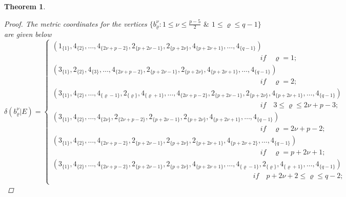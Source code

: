 \documentclass[]{interact}
\theoremstyle{plain}%
\newtheorem{theorem}{Theorem}[section]
\theoremstyle{definition}
\theoremstyle{remark}
\begin{document}
\begin{theorem}
\begin{proof}
                    \noindent The metric coordinates for the vertices 
                     $\{b^\nu_\varrho:1\leq \nu\leq \frac{p-5}{2} $ $ \& $  $1\leq \varrho\leq q-1 \}$ are given below
                        \begin{equation*}
                        \delta(b^{\nu}_{\varrho}|E)=
                   \begin{cases}
                   (1_{\{1\}},4_{\{2\}},\ldots,4_{\{2\nu+p-2\}},2_{\{p+2\nu-1\}},2_{\{p+2\nu\}},4_{\{p+2\nu+1\}},\ldots,4_{\{q-1\}})\\\qquad  \qquad \qquad \qquad \qquad \qquad \qquad \qquad \qquad \qquad  \qquad \qquad\qquad\qquad\quad\textit{if}\quad \varrho= 1;\\
         (3_{\{1\}}, 2_{\{ 2\}},4_{\{3\}},\ldots,4_{\{2\nu+p-2\}},2_{\{p+2\nu-1\}},2_{\{p+2\nu\}},4_{\{p+2\nu+1\}},\ldots,4_{\{q-1\}})\\
         \qquad  \qquad \qquad \qquad \qquad \qquad \qquad \qquad \qquad \qquad  \qquad \qquad\qquad\qquad\quad\textit{if}\quad \varrho=2 ;\\
                     (3_{\{1\}},4_{\{2\}}, \ldots,4_{\{\varrho-1 \}},2_{\{ \varrho \}},4_{\{\varrho +1\}},\ldots,4_{\{2\nu+p-2\}},2_{\{p+2\nu-1\}},2_{\{p+2\nu\}},4_{\{p+2\nu+1\}},\ldots,4_{\{q-1\}})\\
                     \qquad  \qquad \qquad \qquad \qquad \qquad \qquad \qquad \qquad \qquad  \qquad \qquad\qquad\qquad\quad\textit{if}\quad  3 \leq  \varrho  \leq 2\nu+p-3 ;\\
(3_{\{1\}},4_{\{2\}}, \ldots,4_{\{2\nu \}},2_{\{ 2\nu+p-2 \}},2_{\{p+2\nu-1\}},2_{\{p+2\nu\}},4_{\{p+2\nu+1\}},\ldots,4_{\{q-1\}})\\
\qquad  \qquad \qquad \qquad \qquad \qquad \qquad \qquad \qquad \qquad  \qquad \qquad\qquad\qquad\quad\textit{if}\quad   \varrho=2\nu+p-2 ;\\
(3_{\{1\}},4_{\{2\}}, \ldots,4_{\{2\nu+p-2\}},2_{\{p+2\nu-1\}},2_{\{p+2\nu\}},2_{\{ p+2\nu+1 \}},4_{\{ p+2\nu+2 \}},\ldots,4_{\{q-1\}})\\
\qquad  \qquad \qquad \qquad \qquad \qquad \qquad \qquad \qquad \qquad  \qquad \qquad\qquad\qquad\quad\textit{if}\quad  \varrho=p+2\nu+1;\\
                    (3_{\{1\}},4_{\{2\}}, \ldots,4_{\{2\nu+p-2\}},2_{\{p+2\nu-1\}},2_{\{p+2\nu\}},4_{\{p+2\nu+1\}},\ldots,4_{\{\varrho-1 \}},2_{\{ \varrho \}},4_{\{\varrho +1\}},\ldots,4_{\{q-1\}})\\
\quad \qquad \qquad \qquad \qquad \qquad \qquad \qquad \qquad \qquad  \qquad \qquad\qquad\qquad\quad\textit{if}\quad p+2\nu+2 \leq  \varrho  \leq q-2;\\

\end{cases}
\end{equation*}
\end{proof}
\end{theorem}
\end{document}
